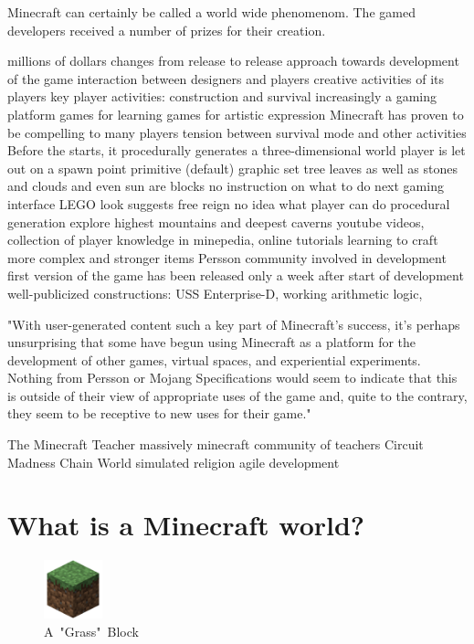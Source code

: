 \cite{baloghcodemetropolis}

Minecraft can certainly be called a world wide phenomenom. The gamed developers received a number of prizes for their creation.

millions of dollars
changes from release to release
approach towards development of the game
interaction between designers and players
creative activities of its players
key player activities: construction and survival
increasingly a gaming platform
games for learning
games for artistic expression
Minecraft has proven to be compelling to many players
tension between survival mode and other activities
Before the starts, it procedurally generates a three-dimensional world
player is let out on a spawn point
primitive (default) graphic set
tree leaves as well as stones and clouds and even sun are blocks
no instruction on what to do next
gaming interface
LEGO look suggests free reign
no idea what player can do
procedural generation explore highest mountains and deepest caverns
youtube videos, collection of player knowledge in minepedia, online tutorials
learning to craft more complex and stronger items
Persson community involved in development
first version of the game has been released only a week after start of development
well-publicized constructions: USS Enterprise-D, working arithmetic logic, 

"With user-generated content such a key part of Minecraft’s success, it’s perhaps unsurprising that some have begun using Minecraft as a platform for the development of other games, virtual spaces, and experiential experiments. Nothing from Persson or Mojang Specifications would seem to indicate that this is outside of their view of appropriate uses of the game and, quite to the contrary, they seem to be receptive to new uses for their game."

The Minecraft Teacher
massively minecraft community of teachers
Circuit Madness
Chain World simulated religion
agile development


\cite{Duncan:2011:MBC:2207096.2207097}

        \section{What is a Minecraft world?}

\begin{figure}
  \begin{center}
    \includegraphics[width=0.15\textwidth]{graphics/block}
  \end{center}
  \caption{A~"Grass"~Block~\cite{image_mob}}
  \label{mc_block}
\end{figure}

